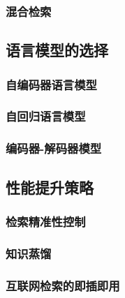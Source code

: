 \subsubsection{混合检索}

\subsection{语言模型的选择}
\subsubsection{自编码器语言模型}
\subsubsection{自回归语言模型}
\subsubsection{编码器-解码器模型}

\subsection{性能提升策略}
\subsubsection{检索精准性控制}
\subsubsection{知识蒸馏}
\subsubsection{互联网检索的即插即用}



